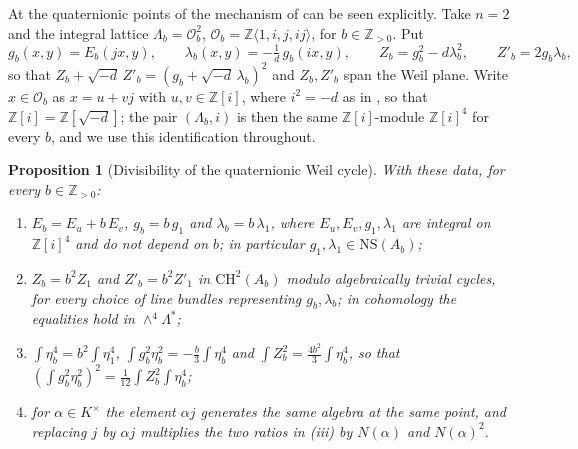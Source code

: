 \documentclass[11pt,reqno]{amsart}
\theoremstyle{plain}
\newtheorem{proposition}[theorem]{Proposition}
\theoremstyle{definition}
\theoremstyle{remark}
\newcommand{\ZZ}{\mathbb{Z}}
\newcommand{\cO}{\mathcal{O}}
\begin{document}
At the quaternionic points of  the mechanism of
 can be seen explicitly. Take $n=2$ and the integral
lattice
$\Lambda_{b}=\cO_{b}^{2}$, $\cO_{b}=\ZZ\langle 1,i,j,ij\rangle$, for
$b\in\ZZ_{>0}$. Put
\[
  g_{b}(x,y)=E_{b}(jx,y),\qquad
  \lambda_{b}(x,y)=-\tfrac{1}{d}\,g_{b}(ix,y),\qquad
  Z_{b}=g_{b}^{2}-d\lambda_{b}^{2},\qquad Z'_{b}=2g_{b}\lambda_{b},
\]
so that $Z_{b}+\sqrt{-d}\,Z'_{b}=(g_{b}+\sqrt{-d}\,\lambda_{b})^{2}$ and
$Z_{b},Z'_{b}$ span the Weil plane. Write $x\in\cO_{b}$ as $x=u+vj$ with
$u,v\in\ZZ[i]$, where $i^{2}=-d$ as in , so that
$\ZZ[i]=\ZZ[\sqrt{-d}]$; the pair $(\Lambda_{b},i)$ is then the same $\ZZ[i]$-module
$\ZZ[i]^{4}$ for every $b$, and we use this identification throughout.

\begin{proposition}[Divisibility of the quaternionic Weil cycle]
\label{prop:quatdivisible}
With these data, for every $b\in\ZZ_{>0}$:
\begin{enumerate}[label=\textup{(\roman*)},nosep]
\item $E_{b}=E_{u}+b\,E_{v}$, $g_{b}=b\,g_{1}$ and $\lambda_{b}=b\,\lambda_{1}$,
  where $E_{u},E_{v},g_{1},\lambda_{1}$ are integral on $\ZZ[i]^{4}$ and do not
  depend on $b$; in particular $g_{1},\lambda_{1}\in\mathrm{NS}(A_{b})$;
\item $Z_{b}=b^{2}Z_{1}$ and $Z'_{b}=b^{2}Z'_{1}$ in $\mathrm{CH}^{2}(A_{b})$
  modulo algebraically trivial cycles, for every choice of line bundles
  representing $g_{b},\lambda_{b}$; in cohomology the equalities hold in
  $\wedge^{4}\Lambda^{*}$;
\item $\int\eta_{b}^{4}=b^{2}\int\eta_{1}^{4}$,
  $\int g_{b}^{2}\eta_{b}^{2}=-\tfrac{b}{3}\int\eta_{b}^{4}$ and
  $\int Z_{b}^{2}=\tfrac{4b^{2}}{3}\int\eta_{b}^{4}$, so that
  $(\int g_{b}^{2}\eta_{b}^{2})^{2}=\tfrac{1}{12}\int Z_{b}^{2}\int\eta_{b}^{4}$;
\item for $\alpha\in K^{\times}$ the element $\alpha j$ generates the same
  algebra at the same point, and replacing $j$ by $\alpha j$ multiplies the
  two ratios in \textup{(iii)} by $N(\alpha)$ and $N(\alpha)^{2}$.
\end{enumerate}
\end{proposition}
\end{document}
